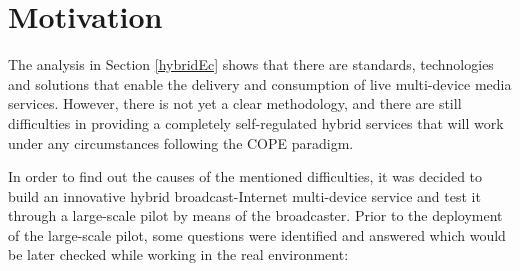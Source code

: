 \section{Motivation}\label{questions}
The analysis in Section \ref{hybridEc} shows that there are standards, technologies and solutions that enable the delivery and consumption of live multi-device media services. However, there is not yet a clear methodology, and there are still difficulties in providing a completely self-regulated hybrid services that will work under any circumstances following the COPE paradigm.

In order to find out the causes of the mentioned difficulties, it was decided to build an innovative hybrid broadcast-Internet multi-device service and test it through a large-scale pilot by means of the broadcaster. Prior to the deployment of the large-scale pilot, some questions were identified and answered which would be later checked while working in the real environment:

